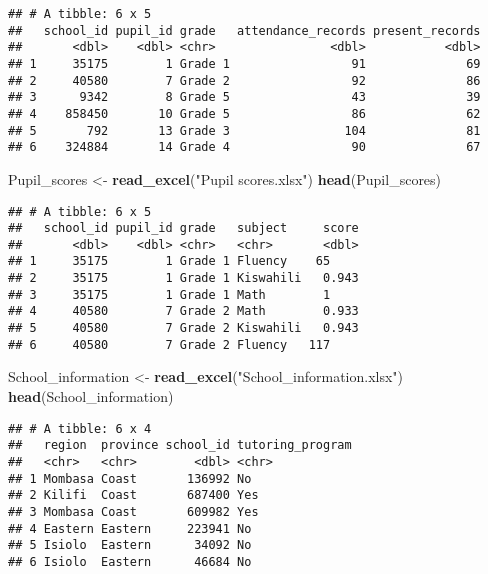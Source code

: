 \documentclass[
]{article}
\newenvironment{Shaded}{\begin{snugshade}}{\end{snugshade}}
\newcommand{\FunctionTok}[1]{\textcolor[rgb]{0.13,0.29,0.53}{\textbf{#1}}}
\newcommand{\NormalTok}[1]{#1}
\newcommand{\OtherTok}[1]{\textcolor[rgb]{0.56,0.35,0.01}{#1}}
\newcommand{\StringTok}[1]{\textcolor[rgb]{0.31,0.60,0.02}{#1}}
\begin{document}
\begin{verbatim}
## # A tibble: 6 x 5
##   school_id pupil_id grade   attendance_records present_records
##       <dbl>    <dbl> <chr>                <dbl>           <dbl>
## 1     35175        1 Grade 1                 91              69
## 2     40580        7 Grade 2                 92              86
## 3      9342        8 Grade 5                 43              39
## 4    858450       10 Grade 5                 86              62
## 5       792       13 Grade 3                104              81
## 6    324884       14 Grade 4                 90              67
\end{verbatim}

\begin{Shaded}
\begin{Highlighting}[]
\NormalTok{Pupil\_scores }\OtherTok{\textless{}{-}} \FunctionTok{read\_excel}\NormalTok{(}\StringTok{"Pupil scores.xlsx"}\NormalTok{)}
\FunctionTok{head}\NormalTok{(Pupil\_scores)}
\end{Highlighting}
\end{Shaded}

\begin{verbatim}
## # A tibble: 6 x 5
##   school_id pupil_id grade   subject     score
##       <dbl>    <dbl> <chr>   <chr>       <dbl>
## 1     35175        1 Grade 1 Fluency    65    
## 2     35175        1 Grade 1 Kiswahili   0.943
## 3     35175        1 Grade 1 Math        1    
## 4     40580        7 Grade 2 Math        0.933
## 5     40580        7 Grade 2 Kiswahili   0.943
## 6     40580        7 Grade 2 Fluency   117
\end{verbatim}

\begin{Shaded}
\begin{Highlighting}[]
\NormalTok{School\_information }\OtherTok{\textless{}{-}} \FunctionTok{read\_excel}\NormalTok{(}\StringTok{"School\_information.xlsx"}\NormalTok{)}
\FunctionTok{head}\NormalTok{(School\_information)}
\end{Highlighting}
\end{Shaded}

\begin{verbatim}
## # A tibble: 6 x 4
##   region  province school_id tutoring_program
##   <chr>   <chr>        <dbl> <chr>           
## 1 Mombasa Coast       136992 No              
## 2 Kilifi  Coast       687400 Yes             
## 3 Mombasa Coast       609982 Yes             
## 4 Eastern Eastern     223941 No              
## 5 Isiolo  Eastern      34092 No              
## 6 Isiolo  Eastern      46684 No
\end{verbatim}
\end{document}
